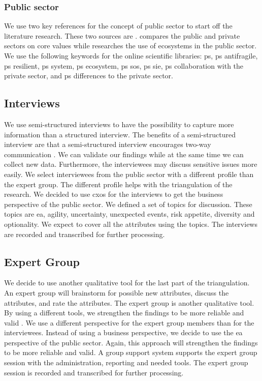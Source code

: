 \subsubsection{Public sector}
\label{subsub:publicsector}
We use two key references for the concept of public sector to start off the literature research. These two sources are \textcites{Wal2008}{Nurmi2021}. \textcite{Wal2008} compares the public and private sectors on core values while \textcite{Nurmi2021} researches the use of ecosystems in the public sector. We use the following keywords for the online scientific libraries: \gls{ps}, \gls{ps} \gls{antifragile}, \gls{ps} \gls{resilient}, \gls{ps} system, \gls{ps} ecosystem, \gls{ps} \gls{sos}, \gls{ps} \gls{sie}, \gls{ps} collaboration with the private sector, and \gls{ps} differences to the private sector.

\subsection{Interviews}
\label{sub:interviews}
We use semi-structured interviews to have the possibility to capture more information than a structured interview. The benefits of a semi-structured interview are that a semi-structured interview encourages two-way communication \parencite[pp.~87--88]{Recker2012}. We can validate our findings while at the same time we can collect new data. Furthermore, the interviewees may discuss sensitive issues more easily. We select interviewees from the public sector with a different profile than the expert group. The different profile helps with the triangulation of the research. We decided to use \glspl{cxo} for the interviews to get the business perspective of the public sector. We defined a set of topics for discussion. These topics are \acrlong{ea}, \gls{agility}, \gls{uncertainty}, unexpected events, risk appetite, \gls{diversity} and \gls{optionality}. We expect to cover all the attributes using the topics. The interviews are recorded and transcribed for further processing.

\subsection{Expert Group}
\label{sub:expertgroup}
We decide to use another qualitative tool for the last part of the \gls{triangulation}. An expert group will brainstorm for possible new \glspl{attribute}, discuss the \glspl{attribute}, and rate the \glspl{attribute}. The expert group is another qualitative tool. By using a different tools, we strengthen the findings to be more reliable and valid \parencite[p.~88]{Recker2012}. We use a different perspective for the expert group members than for the interviewees. Instead of using a business perspective, we decide to use the \acrlong{ea} perspective of the public sector. Again, this approach will strengthen the findings to be more reliable and valid. A group support system supports the expert group session with the administration, reporting and needed tools. The expert group session is recorded and transcribed for further processing.

